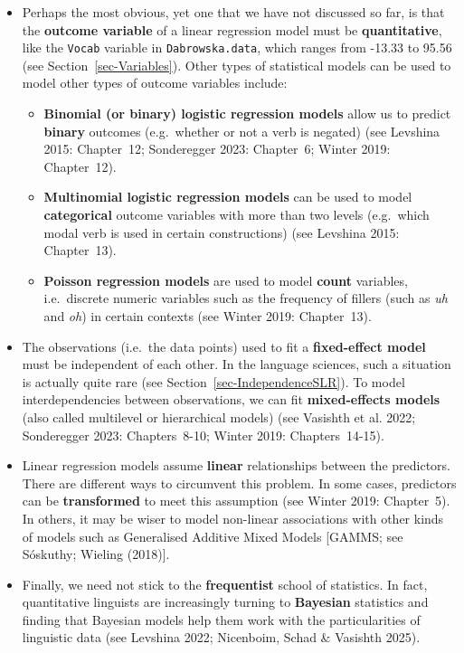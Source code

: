 \documentclass[
  letterpaper,
  DIV=11,
  numbers=noendperiod]{scrreprt}
\begin{document}
\begin{itemize}
\item
  Perhaps the most obvious, yet one that we have not discussed so far,
  is that the \textbf{outcome variable} of a linear regression model
  must be \textbf{quantitative}, like the \texttt{Vocab} variable in
  \texttt{Dabrowska.data}, which ranges from -13.33 to 95.56 (see
  Section~\ref{sec-Variables}). Other types of statistical models can be
  used to model other types of outcome variables include:

  \begin{itemize}
  \item
    \textbf{Binomial (or binary) logistic regression models} allow us to
    predict \textbf{binary} outcomes (e.g.~whether or not a verb is
    negated) (see Levshina 2015: Chapter~12; Sonderegger 2023:
    Chapter~6; Winter 2019: Chapter~12).
  \item
    \textbf{Multinomial logistic regression models} can be used to model
    \textbf{categorical} outcome variables with more than two levels
    (e.g.~which modal verb is used in certain constructions) (see
    Levshina 2015: Chapter~13).
  \item
    \textbf{Poisson regression models} are used to model \textbf{count}
    variables, i.e.~discrete numeric variables such as the frequency of
    fillers (such as \emph{uh} and \emph{oh}) in certain contexts (see
    Winter 2019: Chapter~13).
  \end{itemize}
\item
  The observations (i.e.~the data points) used to fit a
  \textbf{fixed-effect model} must be independent of each other. In the
  language sciences, such a situation is actually quite rare (see
  Section~\ref{sec-IndependenceSLR}). To model interdependencies between
  observations, we can fit \textbf{mixed-effects models} (also called
  multilevel or hierarchical models) (see Vasishth et al. 2022;
  Sonderegger 2023: Chapters~8-10; Winter 2019: Chapters~14-15).
\item
  Linear regression models assume \textbf{linear} relationships between
  the predictors. There are different ways to circumvent this problem.
  In some cases, predictors can be \textbf{transformed} to meet this
  assumption (see Winter 2019: Chapter~5). In others, it may be wiser to
  model non-linear associations with other kinds of models such as
  Generalised Additive Mixed Models {[}GAMMS; see Sóskuthy; Wieling
  (2018){]}.
\item
  Finally, we need not stick to the \textbf{frequentist} school of
  statistics. In fact, quantitative linguists are increasingly turning
  to \textbf{Bayesian} statistics and finding that Bayesian models help
  them work with the particularities of linguistic data (see Levshina
  2022; Nicenboim, Schad \& Vasishth 2025).
\end{itemize}
\end{document}
